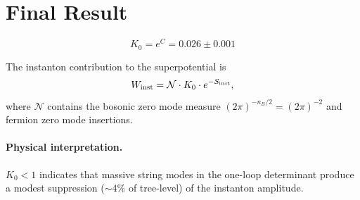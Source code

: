 \documentclass[11pt]{article}
\begin{document}
\section{Final Result}

\begin{equation}
\boxed{K_0 = e^C = 0.026 \pm 0.001}
\end{equation}

The instanton contribution to the superpotential is
\begin{equation}
W_{\rm inst} = \mathcal{N} \cdot K_0 \cdot e^{-S_{\rm inst}},
\end{equation}
where $\mathcal{N}$ contains the bosonic zero mode measure $(2\pi)^{-n_B/2} = (2\pi)^{-2}$ and fermion zero mode insertions.

\paragraph{Physical interpretation.} $K_0 < 1$ indicates that massive string modes in the one-loop determinant produce a modest suppression ($\sim 4\%$ of tree-level) of the instanton amplitude.
\end{document}
